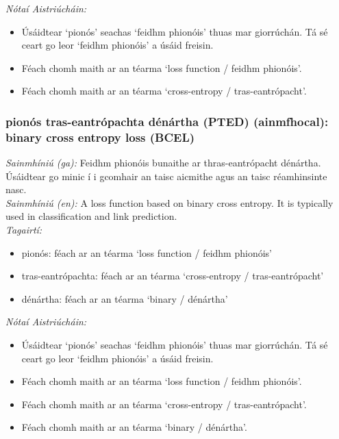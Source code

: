 \documentclass{article}
\begin{document}
 \noindent \textit{Nótaí Aistriúcháin:}
\begin{itemize}
	\item Úsáidtear `pionós' seachas `feidhm phionóis' thuas mar giorrúchán. Tá sé ceart go leor `feidhm phionóis' a úsáid freisin.
	\item Féach chomh maith ar an téarma `loss function / feidhm phionóis'.
	\item Féach chomh maith ar an téarma `cross-entropy / tras-eantrópacht'.
\end{itemize}


\subsubsection*{pionós tras-eantrópachta dénártha (PTED) (ainmfhocal): binary cross entropy loss (BCEL)}
 \noindent \textit{Sainmhíniú (ga):} Feidhm phionóis bunaithe ar thras-eantrópacht dénártha. Úsáidtear go minic í i gcomhair an taisc aicmithe agus an taisc réamhinsinte nasc.
\\
 \noindent \textit{Sainmhíniú (en):} A loss function based on binary cross entropy. It is typically used in classification and link prediction.
\\
 \noindent \textit{Tagairtí:}
\begin{itemize}
	\item pionós: féach ar an téarma `loss function / feidhm phionóis'
	\item tras-eantrópachta: féach ar an téarma `cross-entropy / tras-eantrópacht'
	\item dénártha: féach ar an téarma `binary / dénártha'
\end{itemize}

 \noindent \textit{Nótaí Aistriúcháin:}
\begin{itemize}
	\item Úsáidtear `pionós' seachas `feidhm phionóis' thuas mar giorrúchán. Tá sé ceart go leor `feidhm phionóis' a úsáid freisin.
	\item Féach chomh maith ar an téarma `loss function / feidhm phionóis'.
	\item Féach chomh maith ar an téarma `cross-entropy / tras-eantrópacht'.
	\item Féach chomh maith ar an téarma `binary / dénártha'.
\end{itemize}
\end{document}
